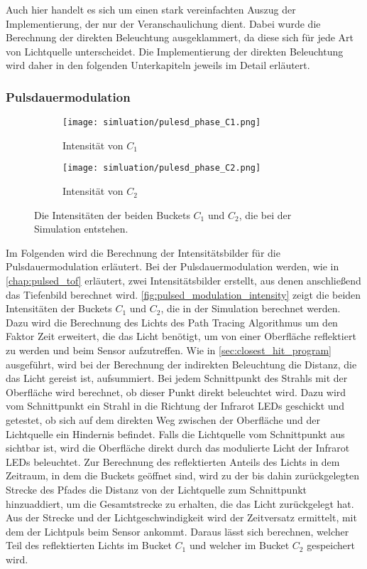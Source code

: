 \documentclass[thesis.tex]{subfiles}
\begin{document}
%
Auch hier handelt es sich um einen stark vereinfachten Auszug der Implementierung, der nur der Veranschaulichung dient. Dabei wurde die Berechnung der direkten Beleuchtung ausgeklammert, da diese sich für jede Art von Lichtquelle unterscheidet. Die Implementierung der direkten Beleuchtung wird daher in den folgenden Unterkapiteln jeweils im Detail erläutert.
%
\subsubsection{Pulsdauermodulation}

\begin{figure}[ht!]
\centering
\begin{subfigure}[b]{0.49\textwidth}
\texttt{[image: simluation/pulesd\_phase\_C1.png]}
\caption{Intensität von $C_1$}
\end{subfigure}
\begin{subfigure}[b]{0.49\textwidth}
\texttt{[image: simluation/pulesd\_phase\_C2.png]}
\caption{Intensität von $C_2$}
\end{subfigure}
\caption{Die Intensitäten der beiden Buckets $C_1$ und $C_2$, die bei der Simulation entstehen.}
\label{fig:pulsed_modulation_intensity}
\end{figure}

Im Folgenden wird die Berechnung der Intensitätsbilder für die Pulsdauermodulation erläutert. Bei der Pulsdauermodulation werden, wie in \autoref{chap:pulsed_tof} erläutert, zwei Intensitätsbilder erstellt, aus denen anschließend das Tiefenbild berechnet wird. \autoref{fig:pulsed_modulation_intensity} zeigt die beiden Intensitäten der Buckets $C_1$ und $C_2$, die in der Simulation berechnet werden. Dazu wird die Berechnung des Lichts des Path Tracing Algorithmus um den Faktor Zeit erweitert, die das Licht benötigt, um von einer Oberfläche reflektiert zu werden und beim Sensor aufzutreffen. Wie in \autoref{sec:closest_hit_program} ausgeführt, wird bei der Berechnung der indirekten Beleuchtung die Distanz, die das Licht gereist ist, aufsummiert. Bei jedem Schnittpunkt des Strahls mit der Oberfläche wird berechnet, ob dieser Punkt direkt beleuchtet wird. Dazu wird vom Schnittpunkt ein Strahl in die Richtung der Infrarot LEDs geschickt und getestet, ob sich auf dem direkten Weg zwischen der Oberfläche und der Lichtquelle ein Hindernis befindet. Falls die Lichtquelle vom Schnittpunkt aus sichtbar ist, wird die Oberfläche direkt durch das modulierte Licht der Infrarot LEDs beleuchtet. Zur Berechnung des reflektierten Anteils des Lichts in dem Zeitraum, in dem die Buckets geöffnet sind, wird zu der bis dahin zurückgelegten Strecke des Pfades die Distanz von der Lichtquelle zum Schnittpunkt hinzuaddiert, um die Gesamtstrecke zu erhalten, die das Licht zurückgelegt hat. Aus der Strecke und der Lichtgeschwindigkeit wird der Zeitversatz ermittelt, mit dem der Lichtpuls beim Sensor ankommt. Daraus lässt sich berechnen, welcher Teil des reflektierten Lichts im Bucket $C_1$ und welcher im Bucket $C_2$ gespeichert wird.
\end{document}
